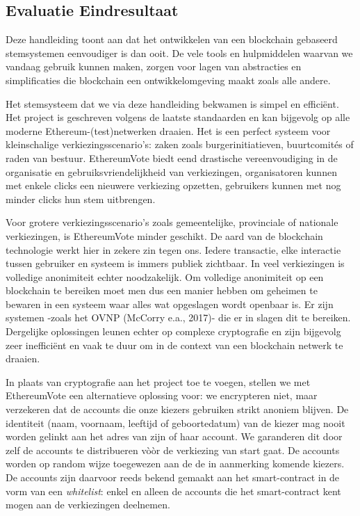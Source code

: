	\subsection{Evaluatie Eindresultaat}
	Deze handleiding toont aan dat het ontwikkelen van een blockchain gebaseerd stemsystemen eenvoudiger is dan ooit. De vele tools en hulpmiddelen waarvan we vandaag gebruik kunnen maken, zorgen voor  lagen van abstracties en simplificaties die blockchain een ontwikkelomgeving maakt zoals alle andere.

	 Het stemsysteem dat we via deze handleiding bekwamen is simpel en efficiënt. Het project is geschreven volgens de laatste standaarden en kan bijgevolg op alle moderne Ethereum-(test)netwerken draaien. Het is een perfect systeem voor kleinschalige verkiezingsscenario's: zaken zoals burgerinitiatieven, buurtcomités of raden van bestuur. EthereumVote biedt eend drastische vereenvoudiging in de organisatie en gebruiksvriendelijkheid van verkiezingen, organisatoren kunnen met enkele clicks een nieuwere verkiezing opzetten, gebruikers kunnen met nog minder clicks hun stem uitbrengen.
	 
	 Voor grotere verkiezingsscenario's zoals gemeentelijke, provinciale of nationale verkiezingen, is EthereumVote minder geschikt. De aard van de blockchain technologie werkt hier in zekere zin tegen ons. Iedere transactie, elke interactie tussen gebruiker en systeem is immers publiek zichtbaar. In veel verkiezingen is volledige anonimiteit echter noodzakelijk. Om volledige anonimiteit op een blockchain te bereiken moet men dus een manier hebben om geheimen te bewaren in een systeem waar alles wat opgeslagen wordt openbaar is. Er zijn systemen -zoals het OVNP (McCorry e.a., 2017)- die er in slagen dit te bereiken. Dergelijke oplossingen leunen echter op complexe cryptografie en zijn bijgevolg zeer inefficiënt en vaak te duur om in de context van een blockchain netwerk te draaien.
	
	In plaats van cryptografie aan het project toe te voegen, stellen we met EthereumVote een alternatieve oplossing voor: we encrypteren niet, maar verzekeren dat de accounts die onze kiezers gebruiken strikt anoniem blijven. De identiteit (naam, voornaam, leeftijd of geboortedatum) van de kiezer mag nooit worden gelinkt aan het adres van zijn of haar account. We garanderen dit door zelf de accounts te distribueren vòòr de verkiezing van start gaat. De accounts worden op random wijze toegewezen aan de de in aanmerking komende kiezers. De accounts zijn daarvoor reeds bekend gemaakt aan het smart-contract in de vorm van een \textit{whitelist}: enkel en alleen de accounts die het smart-contract kent mogen aan de verkiezingen deelnemen. 
	
